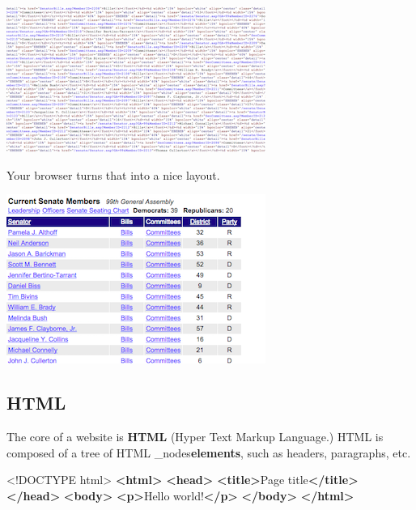 \documentclass[]{book}
\newenvironment{Shaded}{\begin{snugshade}}{\end{snugshade}}
\newcommand{\DataTypeTok}[1]{\textcolor[rgb]{0.13,0.29,0.53}{#1}}
\newcommand{\KeywordTok}[1]{\textcolor[rgb]{0.13,0.29,0.53}{\textbf{#1}}}
\newcommand{\NormalTok}[1]{#1}
\begin{document}
\begin{center}\includegraphics[width=0.7\linewidth]{img/html} \end{center}

Your browser turns that into a nice layout.

\begin{center}\includegraphics[width=0.7\linewidth]{img/layout} \end{center}

\hypertarget{html}{%
\subsection{HTML}\label{html}}

The core of a website is \textbf{HTML} (Hyper Text Markup Language.) HTML is composed of a tree of HTML \_nodes\textbf{elements}, such as headers, paragraphs, etc.

\begin{Shaded}
\begin{Highlighting}[]
\DataTypeTok{<!DOCTYPE }\NormalTok{html}\DataTypeTok{>}
\KeywordTok{<html>}
    \KeywordTok{<head>}
        \KeywordTok{<title>}\NormalTok{Page title}\KeywordTok{</title>}
    \KeywordTok{</head>}
    \KeywordTok{<body>}
        \KeywordTok{<p>}\NormalTok{Hello world!}\KeywordTok{</p>}
    \KeywordTok{</body>}
\KeywordTok{</html>}
\end{Highlighting}
\end{Shaded}
\end{document}
